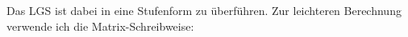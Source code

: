 \documentclass[aspectratio=169, ignorenonframetext]{beamer}
\begin{document}
Das LGS ist dabei in eine Stufenform zu überführen. Zur leichteren Berechnung verwende ich die Matrix-Schreibweise:




\end{document}
